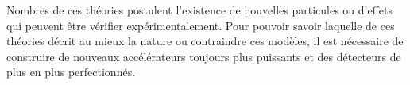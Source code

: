 Nombres de ces théories postulent l'existence de nouvelles particules ou d'effets qui peuvent être vérifier expérimentalement. Pour pouvoir savoir laquelle de ces théories décrit au mieux la nature ou contraindre ces modèles, il est nécessaire de construire de nouveaux accélérateurs toujours plus puissants et des détecteurs de plus en plus perfectionnés. 
